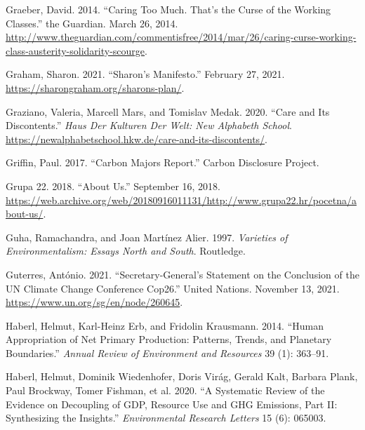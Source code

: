 \documentclass[a4paper, nobind]{templates/ociamthesis}
\newlength{\cslhangindent}
\newenvironment{CSLReferences}[2] %
 {%
  \setlength{\parindent}{0pt}
  \ifodd #1
  \let\oldpar\par
  \def\par{\hangindent=\cslhangindent\oldpar}
  \fi
  \setlength{\parskip}{1mm}
  \setlength{\baselineskip}{6mm}
 }%
 {}
\begin{document}
\begin{CSLReferences}{1}{0}
\leavevmode{}%
Graeber, David. 2014. {``Caring Too Much. {That}'s the Curse of the Working Classes.''} {the Guardian}. March 26, 2014. \url{http://www.theguardian.com/commentisfree/2014/mar/26/caring-curse-working-class-austerity-solidarity-scourge}.

\leavevmode{}%
Graham, Sharon. 2021. {``Sharon's {Manifesto}.''} February 27, 2021. \url{https://sharongraham.org/sharons-plan/}.

\leavevmode{}%
Graziano, Valeria, Marcell Mars, and Tomislav Medak. 2020. {``Care and {Its Discontents}.''} \emph{Haus Der Kulturen Der Welt: New Alphabeth School}. \url{https://newalphabetschool.hkw.de/care-and-its-discontents/}.

\leavevmode{}%
Griffin, Paul. 2017. {``Carbon {Majors Report}.''} {Carbon Disclosure Project}.

\leavevmode{}%
Grupa 22. 2018. {``About {Us}.''} September 16, 2018. \url{https://web.archive.org/web/20180916011131/http://www.grupa22.hr/pocetna/about-us/}.

\leavevmode{}%
Guha, Ramachandra, and Joan Martínez Alier. 1997. \emph{Varieties of {Environmentalism}: {Essays North} and {South}}. {Routledge}.

\leavevmode{}%
Guterres, António. 2021. {``Secretary-{General}'s Statement on the Conclusion of the {UN Climate Change Conference Cop26}.''} {United Nations}. November 13, 2021. \url{https://www.un.org/sg/en/node/260645}.

\leavevmode{}%
Haberl, Helmut, Karl-Heinz Erb, and Fridolin Krausmann. 2014. {``Human {Appropriation} of {Net Primary Production}: {Patterns}, {Trends}, and {Planetary Boundaries}.''} \emph{Annual Review of Environment and Resources} 39 (1): 363--91.

\leavevmode{}%
Haberl, Helmut, Dominik Wiedenhofer, Doris Virág, Gerald Kalt, Barbara Plank, Paul Brockway, Tomer Fishman, et al. 2020. {``A Systematic Review of the Evidence on Decoupling of {GDP}, Resource Use and {GHG} Emissions, Part {II}: Synthesizing the Insights.''} \emph{Environmental Research Letters} 15 (6): 065003.


\end{CSLReferences}
\end{document}
